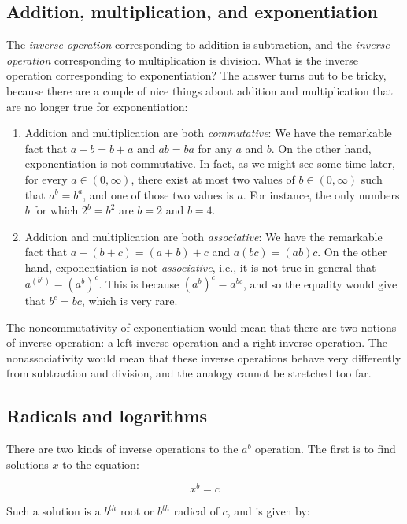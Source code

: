 \documentclass[10pt]{amsart}
\begin{document}
\subsection{Addition, multiplication, and exponentiation}

The {\em inverse operation} corresponding to addition is subtraction,
and the {\em inverse operation} corresponding to multiplication is
division. What is the inverse operation corresponding to
exponentiation? The answer turns out to be tricky, because there are a
couple of nice things about addition and multiplication that are no
longer true for exponentiation:

\begin{enumerate}
\item Addition and multiplication are both {\em commutative}: We have
  the remarkable fact that $a + b = b + a$ and $ab = ba$ for any $a$
  and $b$. On the other hand, exponentiation is not commutative. In
  fact, as we might see some time later, for every $a \in (0,\infty)$,
  there exist at most two values of $b \in (0,\infty)$ such that $a^b
  = b^a$, and one of those two values is $a$. For instance, the only
  numbers $b$ for which $2^b = b^2$ are $b = 2$ and $b = 4$.
\item Addition and multiplication are both {\em associative}: We have
  the remarkable fact that $a + (b + c) = (a + b) + c$ and $a(bc) =
  (ab)c$. On the other hand, exponentiation is not {\em associative},
  i.e., it is not true in general that $a^{(b^c)} = (a^b)^c$. This is
  because $(a^b)^c = a^{bc}$, and so the equality would give that $b^c
  = bc$, which is very rare.
\end{enumerate}

The noncommutativity of exponentiation would mean that there are two
notions of inverse operation: a left inverse operation and a right
inverse operation. The nonassociativity would mean that these inverse
operations behave very differently from subtraction and division, and
the analogy cannot be stretched too far.

\subsection{Radicals and logarithms}

There are two kinds of inverse operations to the $a^b$ operation. The
first is to find solutions $x$ to the equation:

$$x^b = c$$

Such a solution is a $b^{th}$ root or $b^{th}$ radical of $c$, and is given by:
\end{document}
